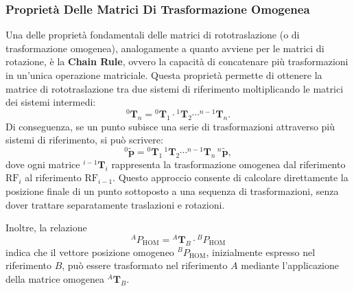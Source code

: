 \documentclass[11pt, a4paper]{report}
\begin{document}
\subsubsection{Proprietà Delle Matrici Di Trasformazione Omogenea}

Una delle proprietà fondamentali delle matrici di rototraslazione (o di trasformazione omogenea), analogamente a quanto avviene per le matrici di rotazione, è la \textbf{Chain Rule}, ovvero la capacità di concatenare più trasformazioni in un'unica operazione matriciale. Questa proprietà permette di ottenere la matrice di rototraslazione tra due sistemi di riferimento moltiplicando le matrici dei sistemi intermedi:
\[
    {}^{0}\mathbf{T}_{n} = {}^{0}\mathbf{T}_{1} \cdot {}^{1}\mathbf{T}_{2} \cdots {}^{n-1}\mathbf{T}_{n}.
\]
Di conseguenza, se un punto subisce una serie di trasformazioni attraverso più sistemi di riferimento, si può scrivere:
\[
    {}^{0}\tilde{\mathbf{p}} = {}^{0}\mathbf{T}_{1} \, {}^{1}\mathbf{T}_{2} \cdots {}^{n-1}\mathbf{T}_{n} \, {}^{n}\tilde{\mathbf{p}},
\]
dove ogni matrice ${}^{i-1}\mathbf{T}_{i}$ rappresenta la trasformazione omogenea dal riferimento $\mathrm{RF}_{i}$ al riferimento $\mathrm{RF}_{i-1}$. Questo approccio consente di calcolare direttamente la posizione finale di un punto sottoposto a una sequenza di trasformazioni, senza dover trattare separatamente traslazioni e rotazioni.

Inoltre, la relazione
\[
    {}^{A}P_{\mathrm{HOM}} = {}^{A}\mathbf{T}_{B} \cdot {}^{B}P_{\mathrm{HOM}}
\]
indica che il vettore posizione omogeneo ${}^{B}P_{\mathrm{HOM}}$, inizialmente espresso nel riferimento $B$, può essere trasformato nel riferimento $A$ mediante l'applicazione della matrice omogenea ${}^{A}\mathbf{T}_{B}$.
\end{document}
